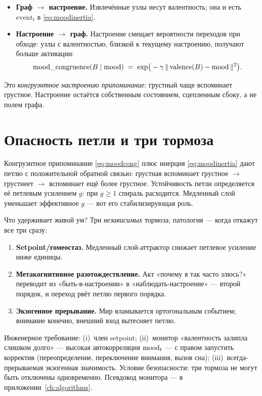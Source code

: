 \begin{itemize}
\item \textbf{Граф $\to$ настроение.} Извлечённые узлы несут валентность; она и есть
$\text{event}_t$ в \eqref{eq:moodinertia}.
\item \textbf{Настроение $\to$ граф.} Настроение смещает вероятности переходов при
обходе: узлы с валентностью, близкой к текущему настроению, получают больше
активации:
\begin{equation}
\text{mood\_congruence}(B\mid \mathrm{mood})\;=\;\exp\!\big(-\gamma\,\|\,\text{valence}(B)-\mathrm{mood}\,\|^2\big).
\label{eq:moodcong}
\end{equation}
\end{itemize}
Это \emph{конгруэнтное настроению припоминание}: грустный чаще вспоминает грустное.
Настроение остаётся собственным состоянием, сцепленным сбоку, а не полем графа.

\section{Опасность петли и три тормоза}

\begin{pitfall}[Руминация]
Конгруэнтное припоминание \eqref{eq:moodcong} плюс инерция \eqref{eq:moodinertia}
дают петлю с положительной обратной связью: грустная вспоминает грустное $\to$
грустнеет $\to$ вспоминает ещё более грустное. Устойчивость петли определяется её
петлевым усилением $g$: при $g\ge 1$ спираль расходится. Медленный слой уменьшает
эффективное $g$ — вот его стабилизирующая роль.
\end{pitfall}

Что удерживает живой ум? Три \emph{независимых} тормоза; патология — когда откажут
все три сразу:

\begin{enumerate}
\item \textbf{Setpoint/гомеостаз.} Медленный слой-аттрактор снижает петлевое
усиление ниже единицы.
\item \textbf{Метакогнитивное разотождествление.} Акт «почему я так часто злюсь?»
переводит из «быть-в-настроении» в «наблюдать-настроение» — второй порядок, и
переход рвёт петлю первого порядка.
\item \textbf{Экзогенное прерывание.} Мир вламывается ортогональным событием;
внимание конечно, внешний вход вытесняет петлю.
\end{enumerate}

Инженерное требование: (i)~член setpoint; (ii)~монитор «валентность залипла слишком
долго» — высокая автокорреляция $\mathrm{mood}_t$ — с правом запустить корректив
(переопределение, переключение внимания, вызов сна); (iii)~всегда-прерываемая
экзогенная значимость. Условие безопасности: три тормоза не могут быть отключены
одновременно. Псевдокод монитора — в приложении~\ref{ch:algorithms}.

